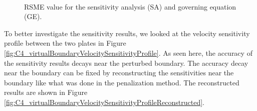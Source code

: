 \begin{figure}[H]
    \centering
    \\
    \caption{RSME value for the sensitivity analysis (SA) and governing equation (GE).}
    \label{fig:C4_virtualBoundarySAconvergence}
\end{figure}

To better investigate the sensitivity results, we looked at the velocity sensitivity profile between the two plates in Figure \ref{fig:C4_virtualBoundaryVelocitySensitivityProfile}. As seen here, the accuracy of the sensitivity results decays near the perturbed boundary. The accuracy decay near the boundary can be fixed by reconstructing the sensitivities near the boundary like what was done in the penalization method. The reconstructed results are shown in Figure \ref{fig:C4_virtualBoundaryVelocitySensitivityProfileReconstructed}.

